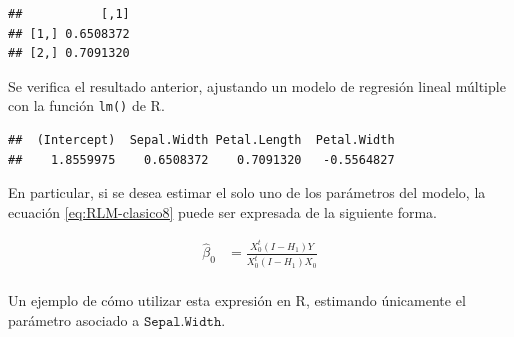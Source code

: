 \documentclass[
  11pt,
]{book}
\newenvironment{Shaded}{\begin{snugshade}}{\end{snugshade}}
\newcommand{\AttributeTok}[1]{\textcolor[rgb]{0.13,0.29,0.53}{#1}}
\newcommand{\CommentTok}[1]{\textcolor[rgb]{0.56,0.35,0.01}{\textit{#1}}}
\newcommand{\FunctionTok}[1]{\textcolor[rgb]{0.13,0.29,0.53}{\textbf{#1}}}
\newcommand{\NormalTok}[1]{#1}
\newcommand{\OtherTok}[1]{\textcolor[rgb]{0.56,0.35,0.01}{#1}}
\newcommand{\SpecialCharTok}[1]{\textcolor[rgb]{0.81,0.36,0.00}{\textbf{#1}}}
\theoremstyle{definition}
\theoremstyle{definition}
\theoremstyle{definition}
\theoremstyle{definition}
\theoremstyle{remark}
\begin{document}
\begin{verbatim}
##           [,1]
## [1,] 0.6508372
## [2,] 0.7091320
\end{verbatim}

Se verifica el resultado anterior, ajustando un modelo de regresión lineal múltiple con la función \texttt{lm()} de R.

\begin{Shaded}
\end{Shaded}

\begin{verbatim}
##  (Intercept)  Sepal.Width Petal.Length  Petal.Width 
##    1.8559975    0.6508372    0.7091320   -0.5564827
\end{verbatim}

En particular, si se desea estimar el solo uno de los parámetros del modelo, la ecuación \eqref{eq:RLM-clasico8} puede ser expresada de la siguiente forma.

\begin{equation}
\begin{split}
\widehat{\beta}_0 &= \frac{X^t_0(I-H_1)Y}{X^t_0(I-H_1)X_0}\\
\end{split}
\label{eq:RLM-clasico9}
\end{equation}

Un ejemplo de cómo utilizar esta expresión en R, estimando únicamente el parámetro asociado a \(\texttt{Sepal.Width}\).
\end{document}

